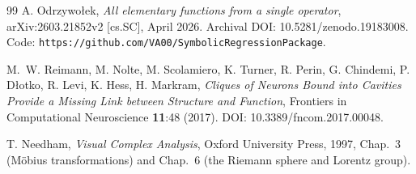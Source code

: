 \documentclass[11pt,a4paper]{article}
\theoremstyle{definition}
\theoremstyle{remark}
\begin{document}
\begin{thebibliography}{99}
A. Odrzywo{\l}ek,
\emph{All elementary functions from a single operator},
arXiv:2603.21852v2 [cs.SC], April 2026.
Archival DOI: 10.5281/zenodo.19183008.
Code: \texttt{https://github.com/VA00/SymbolicRegressionPackage}.

M.~W. Reimann, M. Nolte, M. Scolamiero, K. Turner, R. Perin, G. Chindemi, P. D{\l}otko, R. Levi, K. Hess, H. Markram,
\emph{Cliques of Neurons Bound into Cavities Provide a Missing Link between Structure and Function},
Frontiers in Computational Neuroscience {\bf 11}:48 (2017).
DOI: 10.3389/fncom.2017.00048.

T. Needham,
\emph{Visual Complex Analysis},
Oxford University Press, 1997, Chap.~3 (M\"obius transformations) and Chap.~6 (the Riemann sphere and Lorentz group).

\end{thebibliography}
\end{document}
